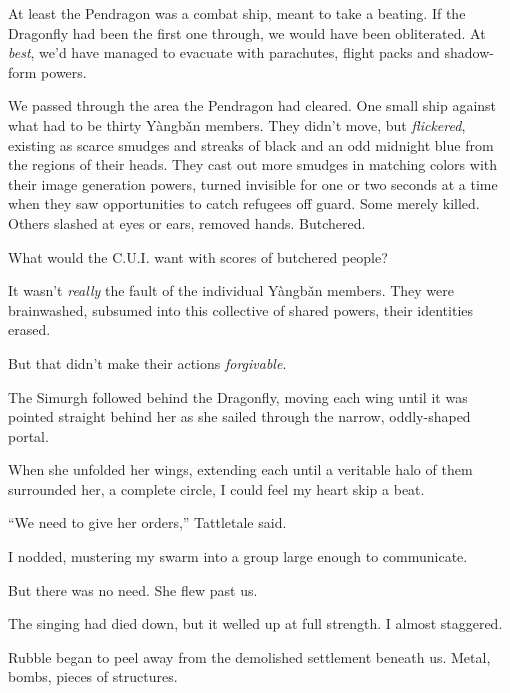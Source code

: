 At least the Pendragon was a combat ship, meant to take a beating.  If the Dragonfly had been the first one through, we would have been obliterated.  At \emph{best}, we'd have managed to evacuate with parachutes, flight packs and shadow-form powers.



We passed through the area the Pendragon had cleared.  One small ship against what had to be thirty Y\`{a}ngb\v{a}n members.  They didn't move, but \emph{flickered}, existing as scarce smudges and streaks of black and an odd midnight blue from the regions of their heads.  They cast out more smudges in matching colors with their image generation powers, turned invisible for one or two seconds at a time when they saw opportunities to catch refugees off guard.  Some merely killed.  Others slashed at eyes or ears, removed hands.  Butchered.



What would the C.U.I. want with scores of butchered people?



It wasn't \emph{really} the fault of the individual Y\`{a}ngb\v{a}n members.  They were brainwashed, subsumed into this collective of shared powers, their identities erased.



But that didn't make their actions \emph{forgivable}.



The Simurgh followed behind the Dragonfly, moving each wing until it was pointed straight behind her as she sailed through the narrow, oddly-shaped portal.



When she unfolded her wings, extending each until a veritable halo of them surrounded her, a complete circle, I could feel my heart skip a beat.



``We need to give her orders,'' Tattletale said.



I nodded, mustering my swarm into a group large enough to communicate.



But there was no need.  She flew past us.



The singing had died down, but it welled up at full strength.  I almost staggered.



Rubble began to peel away from the demolished settlement beneath us.  Metal, bombs, pieces of structures.



